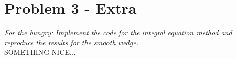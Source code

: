 \section{Problem 3 - Extra}
\textit{For the hungry: Implement the code for the integral equation method and reproduce the results for the smooth wedge.}\\


SOMETHING NICE...